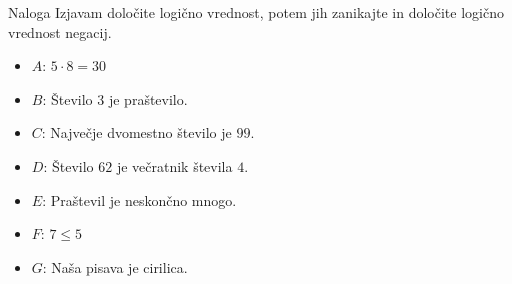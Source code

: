        \begin{frame}
            \begin{exampleblock}{Naloga}
                Izjavam določite logično vrednost, potem jih zanikajte in določite logično vrednost negacij.
                \begin{itemize}
                    \item $A$: $5 \cdot 8 = 30$
                    \item $B$: Število $3$ je praštevilo.
                    \item $C$: Največje dvomestno število je $99$.
                    \item $D$: Število $62$ je večratnik števila $4$.
                    \item $E$: Praštevil je neskončno mnogo.
                    \item $F$: $7 \leq 5$
                    \item $G$: Naša pisava je cirilica.
                \end{itemize}
            \end{exampleblock}
        \end{frame}

